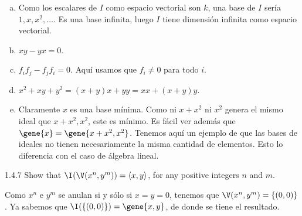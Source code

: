 \documentclass[twoside]{article}
\begin{document}
\begin{solucion}
\begin{enumerate}[a.]
\item Como los escalares de $I$ como espacio vectorial son $k$, una base de $I$ sería $1,x,x^2,\dots$.
Es una base infinita, luego $I$ tiene dimensión infinita como espacio vectorial.
\item $xy-yx = 0$.
\item $f_i f_j - f_j f_i = 0$. Aquí usamos que $f_i \neq 0$ para todo $i$.
\item $x^2+xy+y^2 = (x+y)x+yy = xx+(x+y)y$.
\item Claramente $x$ es una base mínima.
Como ni $x+x^2$ ni $x^2$ genera el mismo ideal que $x+x^2,x^2$, este es mínimo.
Es fácil ver además que $\gene{x}=\gene{x+x^2,x^2}$.
Tenemos aquí un ejemplo de que las bases de ideales no tienen necesariamente la misma cantidad de elementos.
Esto lo diferencia con el caso de álgebra lineal.
\end{enumerate}
\end{solucion}

\newpage

\begin{ejercicio}{1.4.7}
Show that $\I(\V(x^n,y^m))=\langle x,y \rangle$, for any positive integers $n$ and $m$.
\end{ejercicio}
\begin{solucion}
Como $x^n$ e $y^m$ se anulan si y sólo si $x=y=0$, tenemos que $\V(x^n,y^m)= \{(0,0)\}$. Ya sabemos que $\I(\{(0,0)\}) = \gene{x,y}$, de donde se tiene el resultado.
\end{solucion}

\newpage
\end{document}
